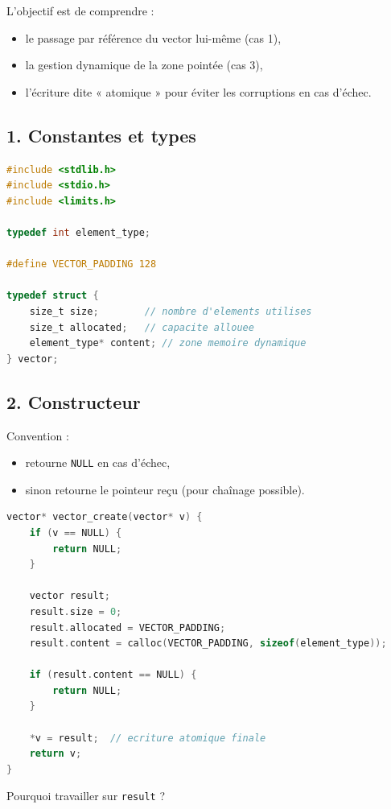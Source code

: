 L’objectif est de comprendre :
\begin{itemize}
    \item le passage par référence du vector lui-même (cas 1),
    \item la gestion dynamique de la zone pointée (cas 3),
    \item l’écriture dite « atomique » pour éviter les corruptions en cas d’échec.
\end{itemize}

\subsection{1. Constantes et types}

\begin{lstlisting}[language=C]
#include <stdlib.h>
#include <stdio.h>
#include <limits.h>

typedef int element_type;

#define VECTOR_PADDING 128

typedef struct {
    size_t size;        // nombre d'elements utilises
    size_t allocated;   // capacite allouee
    element_type* content; // zone memoire dynamique
} vector;
\end{lstlisting}

\subsection{2. Constructeur}

Convention :
\begin{itemize}
    \item retourne \texttt{NULL} en cas d’échec,
    \item sinon retourne le pointeur reçu (pour chaînage possible).
\end{itemize}

\begin{lstlisting}[language=C]
vector* vector_create(vector* v) {
    if (v == NULL) {
        return NULL;
    }

    vector result;
    result.size = 0;
    result.allocated = VECTOR_PADDING;
    result.content = calloc(VECTOR_PADDING, sizeof(element_type));

    if (result.content == NULL) {
        return NULL;
    }

    *v = result;  // ecriture atomique finale
    return v;
}
\end{lstlisting}

Pourquoi travailler sur \texttt{result} ?

